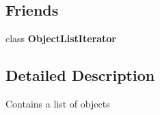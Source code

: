 \subsection*{Friends}
\begin{DoxyCompactItemize}
\item 
\hypertarget{class_object_list_aa604e07e1b616ae586cbc01bcca073c9}{class {\bfseries Object\+List\+Iterator}}\label{class_object_list_aa604e07e1b616ae586cbc01bcca073c9}

\end{DoxyCompactItemize}


\subsection{Detailed Description}
Contains a list of objects 


